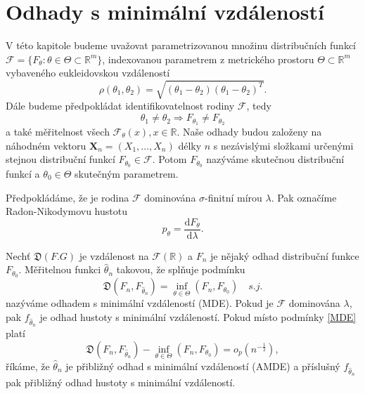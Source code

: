 \chapter{Odhady s minimální vzdáleností}

V této kapitole budeme uvažovat parametrizovanou množinu distribučních funkcí $\mathcal{F} = \lbrace F_\theta : \theta \in \Theta \subset \mathbb{R}^m \rbrace$, indexovanou parametrem z metrického prostoru $\Theta \subset \mathbb{R}^m$ vybaveného eukleidovskou vzdáleností 
\begin{equation}
	\rho (\theta_1,\theta_2) = \sqrt{(\theta_1-\theta_2)(\theta_1-\theta_2)^T}. 
\end{equation}
Dále budeme předpokládat identifikovatelnost rodiny $\mathcal{F}$, tedy 
\begin{equation}
\theta_1 \neq \theta_2 \Rightarrow F_{\theta_1} \neq F_{\theta_2}
\end{equation}
a také měřitelnost všech $\mathcal{F}_\theta(x), x \in \mathbb{R}$. Naše odhady budou založeny na náhodném vektoru $\mathbf{X}_n = (X_1, \ldots ,X_n)$ délky $n$ s nezávislými složkami určenými stejnou distribuční funkcí $F_{\theta_0} \in \mathcal{F}$. Potom $F_{\theta_0}$ nazýváme skutečnou distribuční funkcí a $\theta_0 \in \Theta$ skutečným parametrem. 

Předpokládáme, že je rodina $\mathcal{F}$ dominována $\sigma$-finitní mírou $\lambda$. Pak označíme Radon-Nikodymovu hustotu 
\begin{equation}
p_\theta = \dfrac{\mathrm{d} F_\theta}{\mathrm{d} \lambda}.
\end{equation}

\begin{definition}
	Nech\v{t} $\mathfrak{D}(F.G)$ je vzdálenost na $\mathcal{F}(\mathbb{R})$ a $F_n$ je nějaký odhad distribuční funkce $F_{\theta_0}$. Měřitelnou funkci $\hat{\theta}_n$ takovou, že spl\v{n}uje podmínku
	\begin{equation}
		\mathfrak{D}(F_n, F_{\hat{\theta}_n}) = \inf_{\theta \in \Theta}(F_n, F_{\theta_0}) \quad s.j.
		\label{MDE}
	\end{equation}
	nazýváme odhadem s minimální vzdáleností (MDE). Pokud je $\mathcal{F}$ dominována $\lambda$, pak $f_{\hat{\theta}_n}$  je odhad hustoty s minimální vzdáleností. Pokud místo podmínky \eqref{MDE} platí 
	\begin{equation}
		\mathfrak{D}(F_n, F_{\hat{\theta}_n}) - \inf_{\theta \in \Theta}(F_n, F_{\theta_0}) = o_p(n^{-\frac{1}{2}}), 
	\end{equation}
	říkáme, že $\hat{\theta}_n$ je přibližný odhad s minimální vzdáleností (AMDE) a příslušný  $f_{\hat{\theta}_n}$ pak přibližný odhad hustoty s minimální vzdáleností.
\end{definition}